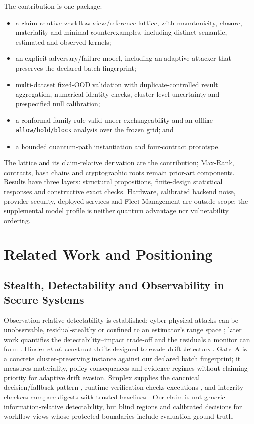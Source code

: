 \documentclass[10pt,journal,compsoc]{IEEEtran}
\begin{document}
The contribution is one package:
\begin{itemize}
  \item a claim-relative workflow view/reference lattice, with monotonicity,
  closure, materiality and minimal counterexamples, including distinct
  semantic, estimated and observed kernels;
  \item an explicit adversary/failure model, including an adaptive attacker
  that preserves the declared batch fingerprint;
  \item multi-dataset fixed-OOD validation with duplicate-controlled result
  aggregation, numerical identity checks, cluster-level uncertainty and
  prespecified null calibration;
  \item a conformal family rule valid under exchangeability and an offline
  \texttt{allow/hold/block} analysis over the frozen grid; and
  \item a bounded quantum-path instantiation and four-contract prototype.
\end{itemize}

The lattice and its claim-relative derivation are the contribution; Max-Rank,
contracts, hash chains and cryptographic roots remain prior-art components.
Results have three layers: structural propositions, finite-design statistical
responses and constructive exact checks. Hardware, calibrated backend noise,
provider security, deployed services and Fleet Management are outside scope;
the supplemental model profile is neither quantum advantage nor vulnerability
ordering.

\section{Related Work and Positioning}

\subsection{Stealth, Detectability and Observability in Secure Systems}

Observation-relative detectability is established: cyber-physical attacks can
be unobservable, residual-stealthy or confined to an estimator's range space
\cite{Pasqualetti2013,Teixeira2015,Liu2011}; later work quantifies the
detectability--impact trade-off and the residuals a monitor can form
\cite{Bai2017,Urbina2016,Giraldo2018}. Hinder \emph{et al.} construct drifts
designed to evade drift detectors \cite{Hinder2025}. Gate~A is a concrete
cluster-preserving instance against our declared batch fingerprint; it measures
materiality, policy consequences and evidence regimes without claiming priority
for adaptive drift evasion. Simplex supplies the canonical decision/fallback
pattern \cite{Seto1998,Sha2001}, runtime verification checks executions
\cite{Leucker2009}, and integrity checkers compare digests with trusted
baselines \cite{Kim1994}. Our claim is not generic information-relative
detectability, but blind regions and calibrated decisions for workflow views
whose protected boundaries include evaluation ground truth.
\end{document}
